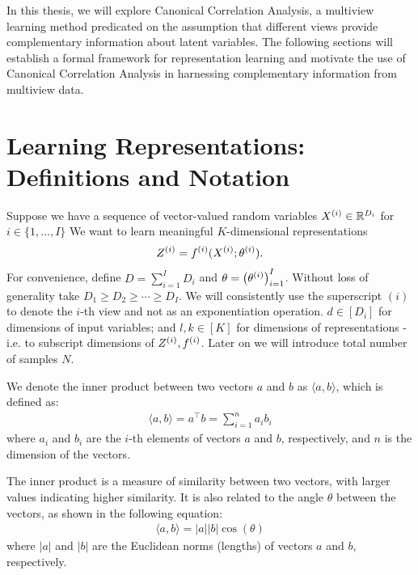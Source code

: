 In this thesis, we will explore Canonical Correlation Analysis, a multiview learning method predicated on the assumption that different \gls{views} provide complementary information about latent variables. The following sections will establish a formal framework for representation learning and motivate the use of Canonical Correlation Analysis in harnessing complementary information from multiview data.

\section{Learning Representations: Definitions and Notation}\label{sec:learning-representations-definitions-and-notation}

Suppose we have a sequence of vector-valued random variables $X^{(i)} \in \mathbb{R}^{D_i}$ for $i \in \{1, \dots, I \}$
We want to learn meaningful $K$-dimensional \gls{representations}
\begin{equation}
    \label{eq:general-form-of-representations}
    Z^{(i)} = f^{(i)}( X^{(i)}; \theta^{(i)}).
\end{equation}
For convenience, define $D = \sum_{i=1}^I D_i$ and $\theta = \left(\theta^{(i)}\right)_{i=1}^I$.
Without loss of generality take $D_1 \geq D_2 \geq \cdots \geq D_I$.
We will consistently use the superscript $(i)$ to denote the $i$-th view and not as an exponentiation operation.
$d \in [D_i]$ for dimensions of input variables;
and $l,k \in [K]$ for dimensions of \gls{representations} - i.e. to subscript dimensions of $Z^{(i)}, f^{(i)}$.
Later on we will introduce total number of samples $N$.

We denote the inner product between two vectors $a$ and $b$ as $\langle a, b \rangle$, which is defined as:
\begin{align}
\label{eq:inner-product}
\langle a, b \rangle = a^\top b = \sum_{i=1}^n a_i b_i
\end{align}
where $a_i$ and $b_i$ are the $i$-th elements of vectors $a$ and $b$, respectively, and $n$ is the dimension of the vectors.

The inner product is a measure of similarity between two vectors, with larger values indicating higher similarity. It is also related to the angle $\theta$ between the vectors, as shown in the following equation:
\begin{align}
\label{eq:inner-product-angle}
\langle a, b \rangle = |a| |b| \cos(\theta)
\end{align}
where $|a|$ and $|b|$ are the Euclidean norms (lengths) of vectors $a$ and $b$, respectively.

